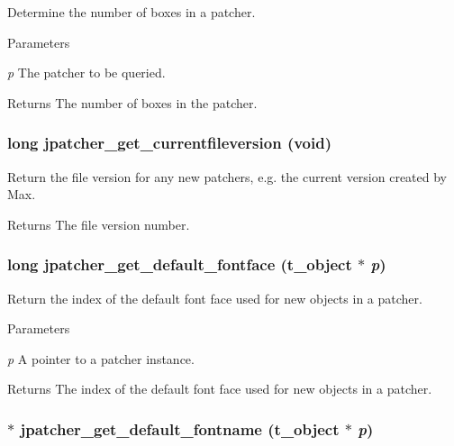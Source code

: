 Determine the number of boxes in a patcher. 
\begin{DoxyParams}{Parameters}
\item[{\em p}]The patcher to be queried. \end{DoxyParams}
\begin{DoxyReturn}{Returns}
The number of boxes in the patcher. 
\end{DoxyReturn}
\hypertarget{group__jpatcher_gac06ed9b2aa744159810c7a735b8be890}{
\subsubsection[{jpatcher\_\-get\_\-currentfileversion}]{\setlength{\rightskip}{0pt plus 5cm}long jpatcher\_\-get\_\-currentfileversion (void)}}
\label{group__jpatcher_gac06ed9b2aa744159810c7a735b8be890}


Return the file version for any new patchers, e.g. the current version created by Max.

\begin{DoxyReturn}{Returns}
The file version number. 
\end{DoxyReturn}
\hypertarget{group__jpatcher_ga2ab66cc8938565435fcf1fc97d73161a}{
\subsubsection[{jpatcher\_\-get\_\-default\_\-fontface}]{\setlength{\rightskip}{0pt plus 5cm}long jpatcher\_\-get\_\-default\_\-fontface ({\bf t\_\-object} $\ast$ {\em p})}}
\label{group__jpatcher_ga2ab66cc8938565435fcf1fc97d73161a}


Return the index of the default font face used for new objects in a patcher. 
\begin{DoxyParams}{Parameters}
\item[{\em p}]A pointer to a patcher instance. \end{DoxyParams}
\begin{DoxyReturn}{Returns}
The index of the default font face used for new objects in a patcher. 
\end{DoxyReturn}
\hypertarget{group__jpatcher_gac5cb14bf7507096591e66b88b7ad0e87}{
\subsubsection[{jpatcher\_\-get\_\-default\_\-fontname}]{$\ast$ jpatcher\_\-get\_\-default\_\-fontname ({\bf t\_\-object} $\ast$ {\em p})}}
\label{group__jpatcher_gac5cb14bf7507096591e66b88b7ad0e87}


